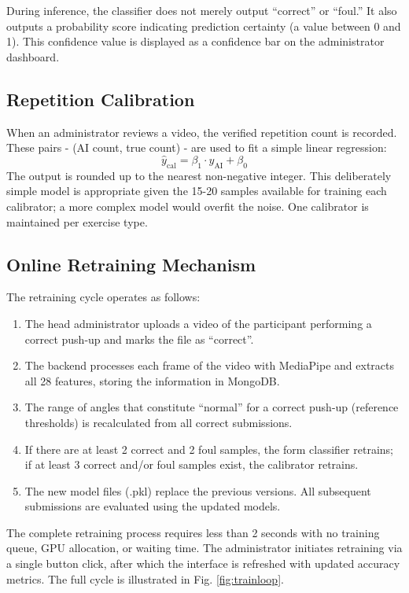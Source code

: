 \documentclass[conference]{IEEEtran}
\begin{document}
During inference, the classifier does not merely output ``correct'' or ``foul.'' It also outputs a probability score indicating prediction certainty (a value between 0 and 1). This confidence value is displayed as a confidence bar on the administrator dashboard.

\subsection{Repetition Calibration}
When an administrator reviews a video, the verified repetition count is recorded. These pairs - (AI count, true count) - are used to fit a simple linear regression:
\begin{equation}
\hat{y}_\text{cal} = \beta_1 \cdot y_\text{AI} + \beta_0
\label{eq:repcal}
\end{equation}
The output is rounded up to the nearest non-negative integer. This deliberately simple model is appropriate given the 15-20 samples available for training each calibrator; a more complex model would overfit the noise. One calibrator is maintained per exercise type.

\subsection{Online Retraining Mechanism}
The retraining cycle operates as follows:
\begin{enumerate}
    \item The head administrator uploads a video of the participant performing a correct push-up and marks the file as ``correct''.
\item The backend processes each frame of the video with MediaPipe and extracts all 28 features, storing the information in MongoDB.
\item The range of angles that constitute ``normal'' for a correct push-up (reference thresholds) is recalculated from all correct submissions.
\item If there are at least 2 correct and 2 foul samples, the form classifier retrains; if at least 3 correct and/or foul samples exist, the calibrator retrains.
\item The new model files (.pkl) replace the previous versions. All subsequent submissions are evaluated using the updated models.
\end{enumerate}
The complete retraining process requires less than 2 seconds with no training queue, GPU allocation, or waiting time. The administrator initiates retraining via a single button click, after which the interface is refreshed with updated accuracy metrics. The full cycle is illustrated in Fig. \ref{fig:trainloop}.
\end{document}
